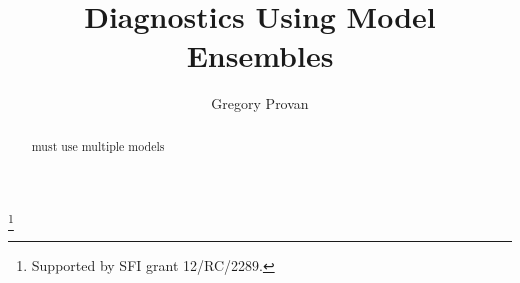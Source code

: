 \documentclass{ifacconf}
\begin{document}
\begin{frontmatter}

\title{Diagnostics Using Model Ensembles}
\thanks[footnoteinfo]{Supported by SFI grant 12/RC/2289.}
\author[First]{Gregory Provan}
\address[First]{Department of Computer Science, University College Cork, Cork, Ireland (Tel: 353-21-490-1816; e-mail: g.provan@ cs.ucc.ie).}

\begin{abstract}
must use multiple models
\end{abstract}
\end{frontmatter}








\end{document}
